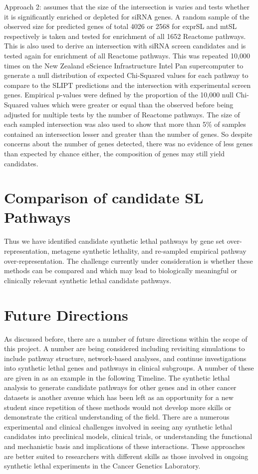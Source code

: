 Approach 2: assumes that the size of the intersection is varies and tests whether it is significantly enriched or depleted for siRNA genes. A random sample of the observed size for predicted genes of total 4026 or 2568 for exprSL and mtSL respectively is taken and tested for enrichment of all 1652 Reactome pathways. This is also used to derive an intersection with siRNA screen candidates and is tested again for enrichment of all Reactome pathways. This was repeated 10,000 times on the New Zealand eScience Infrastructure Intel Pan supercomputer to generate a null distribution of expected Chi-Squared values for each pathway to compare to the SLIPT predictions and the intersection with experimental screen genes. Empirical p-values were defined by the proportion of the 10,000 null Chi-Squared values which were greater or equal than the observed before being adjusted for multiple tests by the number of Reactome pathways. The size of each sampled intersection was also used to show that more than 5\% of samples contained an intersection lesser and greater than the number of genes. So despite concerns about the number of genes detected, there was no evidence of less genes than expected by chance either, the composition of genes may still yield candidates.

\section{Comparison of candidate SL Pathways}

Thus we have identified candidate synthetic lethal pathways by gene set over-representation, metagene synthetic lethality, and re-sampled empirical pathway over-representation. The challenge currently under consideration is whether these methods can be compared and which may lead to biologically meaningful or clinically relevant synthetic lethal candidate pathways.

\section{Future Directions}

As discussed before, there are a number of future directions within the scope of this project. A number are being considered including revisiting simulations to include pathway structure, network-based analyses, and continue investigations into synthetic lethal genes and pathways in clinical subgroups. A number of these are given in as an example in the following Timeline. The synthetic lethal analysis to generate candidate pathways for other genes and in other cancer datasets is another avenue which has been left as an opportunity for a new student since repetition of these methods would not develop more skills or demonstrate the critical understanding of the field. There are a numerous experimental and clinical challenges involved in seeing any synthetic lethal candidates into preclinical models, clinical trials, or understanding the functional and mechanistic basis and implications of these interactions. These approaches are better suited to researchers with different skills as those involved in ongoing synthetic lethal experiments in the Cancer Genetics Laboratory. 

